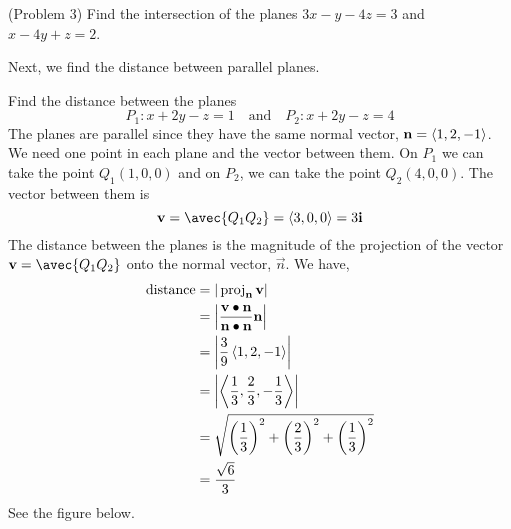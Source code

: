\documentclass[handout]{ximera}
\begin{document}
\begin{problem}(Problem 3)
Find the intersection of the planes $3x - y -4z = 3$ and $x - 4y + z = 2$.\\
\end{problem}


Next, we find the distance between parallel planes.

\begin{example}[Example 4]
Find the distance between the planes 
\[
P_1: x +2y - z = 1 \quad \text{and} \quad P_2: x+2y-z = 4
\]
The planes are parallel since they have the same normal vector, $\mathbf{n} = \left\langle 1, 2, -1\right\rangle$. 
We need one point in each plane and the vector between them.
On $P_1$ we can take the point $Q_1(1, 0, 0)$ and on $P_2$, we can take the point $Q_2(4, 0, 0)$. 
The vector between them is 
\[
\vec{v} = \avec{Q_1Q_2} = \vector{3,0,0} = 3\vec{i}
\]
The distance between the planes is the magnitude of the projection of the vector $\vec{v} = \avec{Q_1Q_2}$ onto the 
normal vector, $\vec{n}$. We have,
\begin{align*}
\text{distance} &= | \operatorname{proj}_{\mathbf{n}}\mathbf{v}| \\
               &= \left| \frac{\mathbf{v}\bullet \mathbf{n}}{\mathbf{n}\bullet \mathbf{n}} \mathbf{n}\right|\\
               &= \left|\frac{3}{9} \left\langle 1, 2, -1\right\rangle\right|\\
               &= \left| \left\langle \frac13, \frac23, -\frac13\right\rangle\right|\\
               &= \sqrt{\left( \frac13\right)^2 + \left( \frac23\right)^2 + \left( \frac13\right)^2}\\
               & = \frac{\sqrt{6}}{3}
\end{align*}
See the figure below.

\begin{image}
\end{image}

\end{example}
\end{document}
